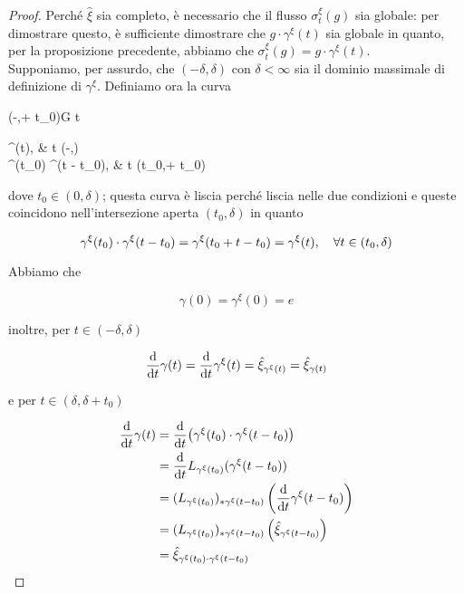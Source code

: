 \begin{proof}
	Perché $ \hat{\xi} $ sia completo, è necessario che il flusso $ \sigma_{t}^{\xi}(g) $ sia globale: per dimostrare questo, è sufficiente dimostrare che $ g \cdot \gamma^{\xi}(t) $ sia globale in quanto, per la proposizione precedente, abbiamo che $ \sigma_{t}^{\xi}(g) = g \cdot \gamma^{\xi}(t) $.\\
	Supponiamo, per assurdo, che $ (-\delta,\delta) $ con $ \delta < \infty $ sia il dominio massimale di definizione di $ \gamma^{\xi} $. Definiamo ora la curva
	
	\map{\gamma}
		{(-\delta,\delta + t_{0})}{G}
		{t}{%
			\begin{cases}
				\gamma^{\xi}(t), & t \in (-\delta,\delta) \\
				\gamma^{\xi}(t_{0}) \cdot \gamma^{\xi}(t - t_{0}), & t \in (t_{0},\delta + t_{0})
			\end{cases}%
			}
		
	dove $ t_{0} \in (0,\delta) $; questa curva è liscia perché liscia nelle due condizioni e queste coincidono nell'intersezione aperta $ (t_{0},\delta) $ in quanto
	
	\begin{equation}
		\gamma^{\xi}(t_{0}) \cdot \gamma^{\xi}(t - t_{0}) %
		= \gamma^{\xi}(t_{0} + t - t_{0}) %
		= \gamma^{\xi}(t) %
		\qcomma \forall t \in (t_{0},\delta)
	\end{equation}

	Abbiamo che
	
	\begin{equation}
		\gamma(0) = \gamma^{\xi}(0) = e
	\end{equation}
	
	inoltre, per $ t \in (-\delta,\delta) $
	
	\begin{equation}
		\dv{t} \gamma(t) = \dv{t} \gamma^{\xi}(t) %
		= \hat{\xi}_{\gamma^{\xi}(t)} %
		= \hat{\xi}_{\gamma(t)}
	\end{equation}

	e per $ t \in (\delta,\delta + t_{0}) $
	
	\begin{align}
		\begin{split}
			\dv{t} \gamma(t) &= \dv{t} ( \gamma^{\xi}(t_{0}) \cdot \gamma^{\xi}(t - t_{0}) ) \\
			&= \dv{t} L_{\gamma^{\xi}(t_{0})} ( \gamma^{\xi}(t - t_{0}) ) \\
			&= (L_{\gamma^{\xi}(t_{0})})_{*\gamma^{\xi}(t - t_{0})} \left( \dv{t} \gamma^{\xi}(t - t_{0}) \right) \\
			&= (L_{\gamma^{\xi}(t_{0})})_{*\gamma^{\xi}(t - t_{0})} \left( \hat{\xi}_{\gamma^{\xi}(t - t_{0})} \right) \\
			&= \hat{\xi}_{\gamma^{\xi}(t_{0}) \cdot \gamma^{\xi}(t - t_{0})}
		\end{split}
	\end{align}
	

\end{proof}
